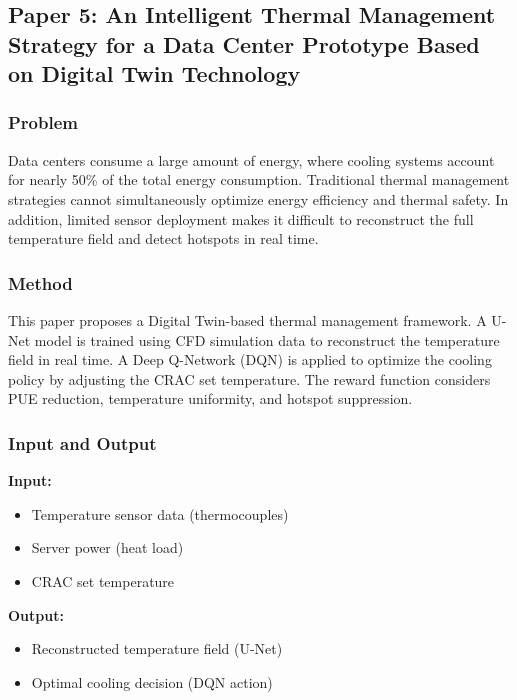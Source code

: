 \documentclass[12pt,a4paper]{article}
\begin{document}
\newpage

\subsection{Paper 5:
        An Intelligent Thermal Management Strategy for a Data Center Prototype Based on Digital Twin Technology}
    \subsubsection{Problem}
    Data centers consume a large amount of energy, where cooling systems account for nearly 50\% of the total energy consumption. Traditional thermal management strategies cannot simultaneously optimize energy efficiency and thermal safety. In addition, limited sensor deployment makes it difficult to reconstruct the full temperature field and detect hotspots in real time.

    \subsubsection{Method}
    This paper proposes a Digital Twin-based thermal management framework. A U-Net model is trained using CFD simulation data to reconstruct the temperature field in real time. A Deep Q-Network (DQN) is applied to optimize the cooling policy by adjusting the CRAC set temperature. The reward function considers PUE reduction, temperature uniformity, and hotspot suppression.

    \subsubsection{Input and Output}
    
                \textbf{Input:}
                \begin{itemize}
                    \item Temperature sensor data (thermocouples)
                    \item Server power (heat load)
                    \item CRAC set temperature
                \end{itemize}
                
                \textbf{Output:}
                \begin{itemize}
                    \item Reconstructed temperature field (U-Net)
                    \item Optimal cooling decision (DQN action)
                \end{itemize}
                
\end{document}
